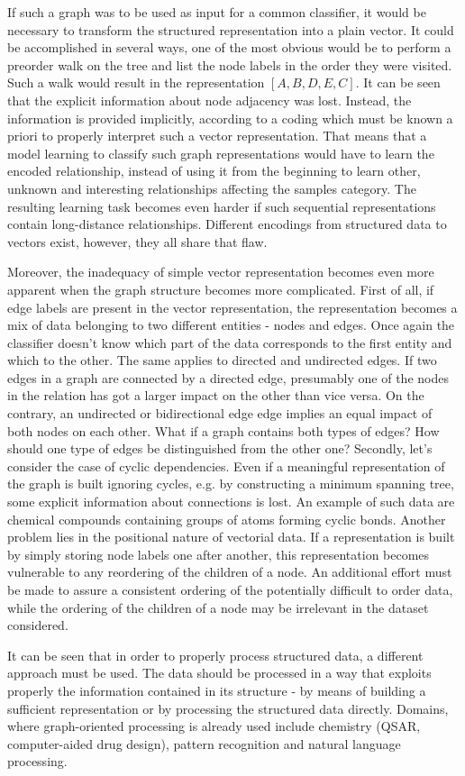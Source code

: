  If such a graph was to be used as input for a common classifier, it would be necessary to transform the structured representation into a plain vector. It could be accomplished in several ways, one of the most obvious would be to perform a preorder walk on the tree and list the node labels in the order they were visited. Such a walk would result in the representation $[A,B,D,E,C]$. It can be seen that the explicit information about node adjacency was lost. Instead, the information is provided implicitly, according to a coding which must be known a priori to properly interpret such a vector representation. That means that a model learning to classify such graph representations would have to learn the encoded relationship, instead of using it from the beginning to learn other, unknown and interesting relationships affecting the samples category. The resulting learning task becomes even harder if such sequential representations contain long-distance relationships. Different encodings from structured data to vectors exist, however, they all share that flaw.

Moreover, the inadequacy of simple vector representation becomes even more apparent when the graph structure becomes more complicated. First of all, if edge labels are present in the vector representation, the representation becomes a mix of data belonging to two different entities - nodes and edges. Once again the classifier doesn't know which part of the data corresponds to the first entity and which to the other. The same applies to directed and undirected edges. If two edges in a graph are connected by a directed edge, presumably one of the nodes in the relation has got a larger impact on the other than vice versa. On the contrary, an undirected or bidirectional edge edge implies an equal impact of both nodes on each other. What if a graph contains both types of edges? How should one type of edges be distinguished from the other one? Secondly, let's consider the case of cyclic dependencies. Even if a meaningful representation of the graph is built ignoring cycles, e.g. by constructing a minimum spanning tree, some explicit information about connections is lost. An example of such data are chemical compounds containing groups of atoms forming cyclic bonds. Another problem lies in the positional nature of vectorial data. If a representation is built by simply storing node labels one after another, this representation becomes vulnerable to any reordering of the children of a node. An additional effort must be made to assure a consistent ordering of the potentially difficult to order data, while the ordering of the children of a node may be irrelevant in the dataset considered.

It can be seen that in order to properly process structured data, a different approach must be used. The data should be processed in a way that exploits properly the information contained in its structure - by means of building a sufficient representation or by processing the structured data directly. Domains, where graph-oriented processing is already used include chemistry (QSAR, computer-aided drug design), pattern recognition and natural language processing.






